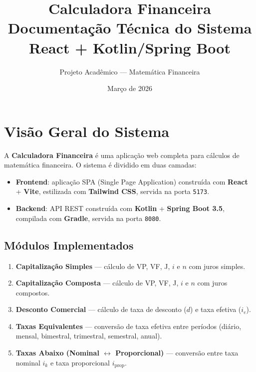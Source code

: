 \documentclass[12pt,a4paper]{article}
\title{
  \vspace{2cm}
  {\Huge\bfseries Calculadora Financeira}\\[0.5cm]
  {\Large Documentação Técnica do Sistema}\\[1cm]
  {\normalsize React + Kotlin/Spring Boot}
}
\author{Projeto Acadêmico --- Matemática Financeira}
\date{Março de 2026}
\begin{document}
\maketitle
\thispagestyle{empty}
\newpage

\tableofcontents
\newpage

\section{Visão Geral do Sistema}

A \textbf{Calculadora Financeira} é uma aplicação web completa para cálculos de matemática financeira. O sistema é dividido em duas camadas:

\begin{itemize}[leftmargin=2em]
  \item \textbf{Frontend}: aplicação SPA (Single Page Application) construída com \textbf{React} + \textbf{Vite}, estilizada com \textbf{Tailwind CSS}, servida na porta \texttt{5173}.
  \item \textbf{Backend}: API REST construída com \textbf{Kotlin} + \textbf{Spring Boot 3.5}, compilada com \textbf{Gradle}, servida na porta \texttt{8080}.
\end{itemize}

\subsection{Módulos Implementados}

\begin{enumerate}
  \item \textbf{Capitalização Simples} --- cálculo de VP, VF, J, $i$ e $n$ com juros simples.
  \item \textbf{Capitalização Composta} --- cálculo de VP, VF, J, $i$ e $n$ com juros compostos.
  \item \textbf{Desconto Comercial} --- cálculo de taxa de desconto ($d$) e taxa efetiva ($i_e$).
  \item \textbf{Taxas Equivalentes} --- conversão de taxa efetiva entre períodos (diário, mensal, bimestral, trimestral, semestral, anual).
  \item \textbf{Taxas Abaixo (Nominal $\leftrightarrow$ Proporcional)} --- conversão entre taxa nominal $i_k$ e taxa proporcional $i_{\text{prop}}$.
\end{enumerate}

\end{document}
